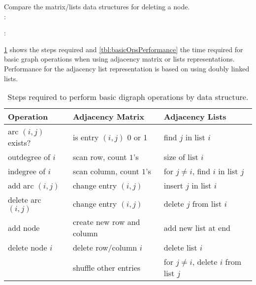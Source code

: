\begin{Boxample}[3]
Compare the matrix/lists data structures for deleting a node.\\
	: \vspace{3cm}
	
	: 
\end{Boxample}

\cref{tbl:basicOpsSteps} shows the steps required  
and \cref{tbl:basicOpsPerformance} the time required for basic graph operations 
when using adjacency matrix or lists representations.  
Performance for the adjacency list representation is based on using doubly linked lists.

\begin{table}[H]
\centering
\caption{Steps required to perform basic digraph operations by data structure.}
\label{tbl:basicOpsSteps}
\begin{tabular}{|l|l|l|}
\hline
\textbf{Operation} & \textbf{Adjacency Matrix} & \textbf{Adjacency Lists} \\
\hline
arc $(i, j)$ exists? & is entry $(i,j)$ 0 or 1  & find $j$ in  list $i$ \\
\hline
outdegree  of $i$ & scan row, count $1$'s & size of  list  $i$\\
\hline
indegree of $i$ & scan column,  count $1$'s & for $j\neq i$, find $i$ in list $j$ \\
\hline
add arc $(i, j)$ & change entry $(i ,j)$ & insert $j$ in list $i$ \\
\hline
delete arc $(i, j)$ & change entry $(i ,j)$ & delete $j$ from list $i$ \\
\hline
add node & create new row and column & add new list at end\\
\hline
delete node $i$ & delete row/column $i$  & delete list $i$ \\
& shuffle other entries & for $j\neq i$, delete  $i$ from list $j$ \\
\hline
\end{tabular}
\end{table}

